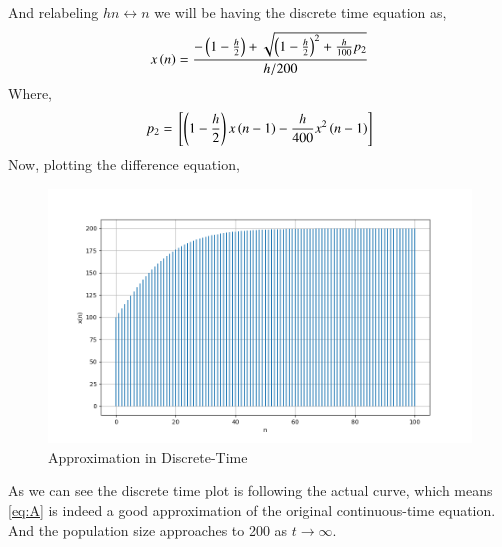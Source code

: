 \documentclass[journal,12pt,twocolumn]{IEEEtran}
\theoremstyle{remark}
\begin{document}
And relabeling $hn\longleftrightarrow n$ we will be having the discrete time equation as,
\begin{align}
    x\left(n\right)=\frac{-\left(1-\frac{h}{2}\right)+\sqrt{\left(1-\frac{h}{2}\right)^2+\frac{h}{100}p_2}}{h/200} \label{eq:A}
\end{align}
Where,
\begin{align}
    p_2={}\left[\left(1-\frac{h}{2}\right)x\left(n-1\right)-\frac{h}{400}x^2\left(n-1\right)\right]
\end{align}
Now, plotting the difference equation,
\begin{figure}[h]
    \centering
    \includegraphics[width=\columnwidth]{figs/DT.png}
    \caption{Approximation in Discrete-Time}
\end{figure}
\newline
As we can see the discrete time plot is following the actual curve, which means \eqref{eq:A} is indeed a good approximation of the original continuous-time equation.
\newline
And the population size approaches to 200 as $t \rightarrow \infty$.
\end{document}
